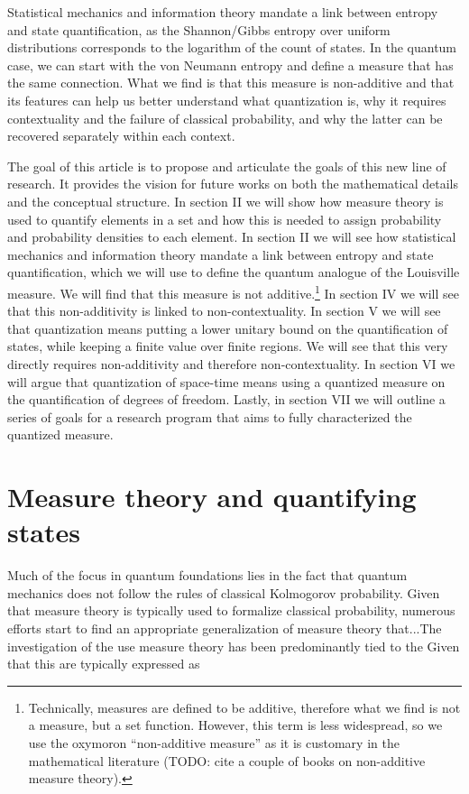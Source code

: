 \documentclass[10pt,twocolumn, nofootinbib]{revtex4-2}
\begin{document}
Statistical mechanics and information theory mandate a link between entropy and state quantification, as the Shannon/Gibbs entropy over uniform distributions corresponds to the logarithm of the count of states. In the quantum case, we can start with the von Neumann entropy and define a measure that has the same connection. What we find is that this measure is non-additive and that its features can help us better understand what quantization is, why it requires contextuality and the failure of classical probability, and why the latter can be recovered separately within each context.

The goal of this article is to propose and articulate the goals of this new line of research. It provides the vision for future works on both the mathematical details and the conceptual structure. In section II we will show how measure theory is used to quantify elements in a set and how this is needed to assign probability and probability densities to each element. In section II we will see how statistical mechanics and information theory mandate a link between entropy and state quantification, which we will use to define the quantum analogue of the Louisville measure. We will find that this measure is not additive.\footnote{Technically, measures are defined to be additive, therefore what we find is not a measure, but a set function. However, this term is less widespread, so we use the oxymoron ``non-additive measure'' as it is customary in the mathematical literature (TODO: cite a couple of books on non-additive measure theory).} In section IV we will see that this non-additivity is linked to non-contextuality. In section V we will see that quantization means putting a lower unitary bound on the quantification of states, while keeping a finite value over finite regions. We will see that this very directly requires non-additivity and therefore non-contextuality. In section VI we will argue that quantization of space-time means using a quantized measure on the quantification of degrees of freedom. Lastly, in section VII we will outline a series of goals for a research program that aims to fully characterized the quantized measure.

\section{Measure theory and quantifying states}

Much of the focus in quantum foundations lies in the fact that quantum mechanics does not follow the rules of classical Kolmogorov probability. Given that measure theory is typically used to formalize classical probability, numerous efforts start to find an appropriate generalization of measure theory that...The investigation of the use measure theory has been predominantly tied to the Given that this are typically expressed as 
\end{document}
